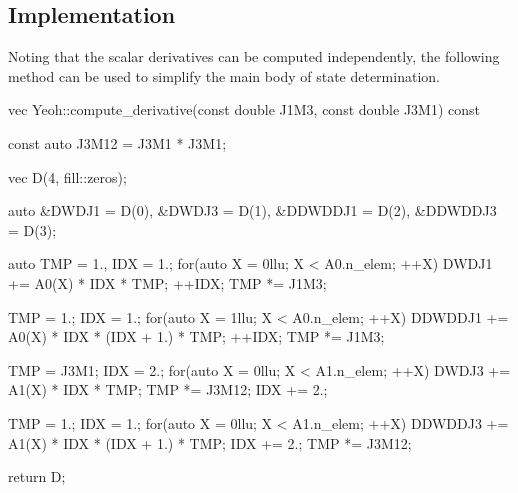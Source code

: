 \subsection{Implementation}
Noting that the scalar derivatives can be computed independently, the following method can be used to simplify the main body of state determination.
\begin{cppcode}
vec Yeoh::compute_derivative(const double J1M3, const double J3M1) const {
    const auto J3M12 = J3M1 * J3M1;

    vec D(4, fill::zeros);

    auto &DWDJ1 = D(0), &DWDJ3 = D(1), &DDWDDJ1 = D(2), &DDWDDJ3 = D(3);

    auto TMP = 1., IDX = 1.;
    for(auto X = 0llu; X < A0.n_elem; ++X) {
        DWDJ1 += A0(X) * IDX * TMP;
        ++IDX;
        TMP *= J1M3;
    }

    TMP = 1.;
    IDX = 1.;
    for(auto X = 1llu; X < A0.n_elem; ++X) {
        DDWDDJ1 += A0(X) * IDX * (IDX + 1.) * TMP;
        ++IDX;
        TMP *= J1M3;
    }

    TMP = J3M1;
    IDX = 2.;
    for(auto X = 0llu; X < A1.n_elem; ++X) {
        DWDJ3 += A1(X) * IDX * TMP;
        TMP *= J3M12;
        IDX += 2.;
    }

    TMP = 1.;
    IDX = 1.;
    for(auto X = 0llu; X < A1.n_elem; ++X) {
        DDWDDJ3 += A1(X) * IDX * (IDX + 1.) * TMP;
        IDX += 2.;
        TMP *= J3M12;
    }

    return D;
}
\end{cppcode}

